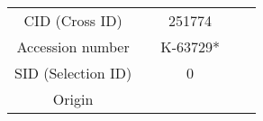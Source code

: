 \documentclass[]{article}
\begin{document}
\begin{longtable}[]{@{}ccccc@{}}
\begin{minipage}[t]{0.06\columnwidth}
CID (Cross ID)\strut
\end{minipage} & \begin{minipage}[t]{0.08\columnwidth}\centering\strut
\strut
\end{minipage} & \begin{minipage}[t]{0.11\columnwidth}\centering\strut
251774\strut
\end{minipage} & \begin{minipage}[t]{0.08\columnwidth}\centering\strut
\strut
\end{minipage} & \begin{minipage}[t]{0.12\columnwidth}\centering\strut
\strut
\end{minipage}\tabularnewline
\begin{minipage}[t]{0.06\columnwidth}\centering\strut
Accession number\strut
\end{minipage} & \begin{minipage}[t]{0.08\columnwidth}\centering\strut
\strut
\end{minipage} & \begin{minipage}[t]{0.11\columnwidth}\centering\strut
K-63729*\strut
\end{minipage} & \begin{minipage}[t]{0.08\columnwidth}\centering\strut
\strut
\end{minipage} & \begin{minipage}[t]{0.12\columnwidth}\centering\strut
\strut
\end{minipage}\tabularnewline
\begin{minipage}[t]{0.06\columnwidth}\centering\strut
SID (Selection ID)\strut
\end{minipage} & \begin{minipage}[t]{0.08\columnwidth}\centering\strut
\strut
\end{minipage} & \begin{minipage}[t]{0.11\columnwidth}\centering\strut
0\strut
\end{minipage} & \begin{minipage}[t]{0.08\columnwidth}\centering\strut
\strut
\end{minipage} & \begin{minipage}[t]{0.12\columnwidth}\centering\strut
\strut
\end{minipage}\tabularnewline
\begin{minipage}[t]{0.06\columnwidth}\centering\strut
Origin\strut
\end{minipage} & \begin{minipage}[t]{0.08\columnwidth}\centering\strut

\end{minipage}
\end{longtable}
\end{document}
